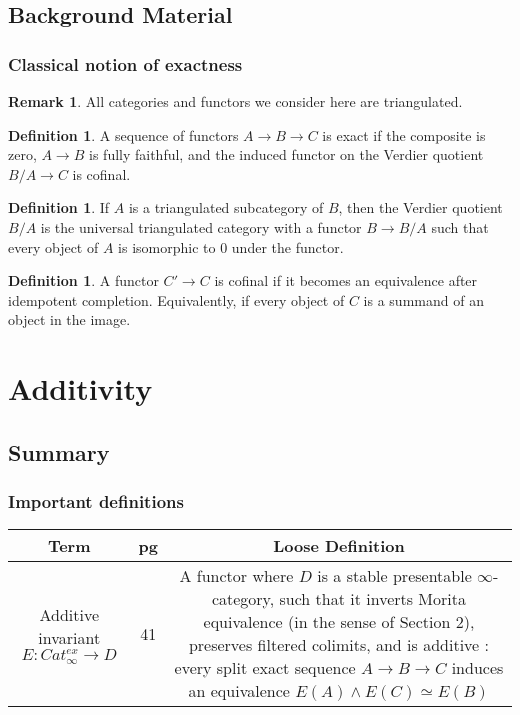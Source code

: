 \documentclass[letterpaper]{article}
\theoremstyle{definition}
\newtheorem{definition}[lemma]{Definition}
\newtheorem{remark}[lemma]{Remark}
\begin{document}
\subsection{Background Material}

\subsubsection{Classical notion of exactness}

\begin{remark}
All categories and functors we consider here are triangulated. 
\end{remark}

\begin{definition}
A sequence of functors $A \rightarrow B \rightarrow C$ is exact if the composite is zero, $A \rightarrow B$ is fully faithful, and the induced functor on the Verdier quotient $B/A \rightarrow C$ is cofinal. 
\end{definition}

\begin{definition}
If $A$ is a triangulated subcategory of $B$, then the Verdier quotient $B/A$ is the universal triangulated category with a functor $B \rightarrow B/A$ such that every object of $A$ is isomorphic to 0 under the functor. 
\end{definition}

\begin{definition}
A functor $C' \rightarrow C$ is cofinal if it becomes an equivalence after idempotent completion. Equivalently, if every object of $C$ is a summand of an object in the image. 
\end{definition}

\section{Additivity}

\subsection{Summary}

\subsubsection{Important definitions}
\begin{tabulary}{0.9\textwidth}{|C|C|C|}
\hline
Term & pg & Loose Definition\\
\hline
\hline
Additive invariant $E : Cat_\infty^{ex} \rightarrow D$ & 41 & A functor where $D$ is a stable presentable $\infty$-category, such that it inverts Morita equivalence (in the sense of Section 2), preserves filtered colimits, and is additive : every split exact sequence $A \rightarrow B \rightarrow C$ induces an equivalence $E(A) \wedge E(C) \simeq E(B)$\\
\hline
\end{tabulary}
\end{document}
